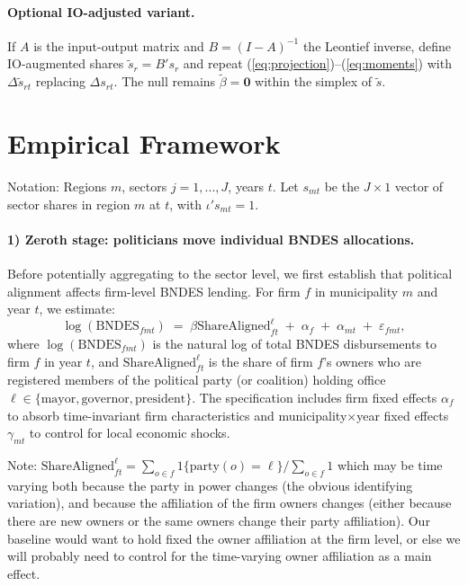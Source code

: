 \documentclass{article}
\begin{document}
\paragraph{Optional IO-adjusted variant.}
If $A$ is the input-output matrix and $B=(I-A)^{-1}$ the Leontief inverse, define IO-augmented shares $\tilde s_r = B' s_r$
and repeat (\ref{eq:projection})--(\ref{eq:moments}) with $\Delta \tilde s_{rt}$ replacing $\Delta s_{rt}$.
The null remains $\tilde\beta=\mathbf{0}$ within the simplex of $\tilde s$.

\section{Empirical Framework}

Notation:
Regions $m$, sectors $j=1,...,J$, years $t$. Let $s_{mt}$ be the $J\times 1$ vector of sector shares in region $m$ at $t$, with $\iota' s_{mt} = 1$.

\paragraph{1) Zeroth stage: politicians move individual BNDES allocations.}

Before potentially aggregating to the sector level, we first establish that political alignment affects firm-level BNDES lending. For firm $f$ in municipality $m$ and year $t$, we estimate:
\begin{equation}
    \label{eq:zerothstage_emp}
    \log(\text{BNDES}_{fmt}) \;=\; \beta  \text{ShareAligned}^{\ell}_{ft} \;+\; \alpha_f \;+\; \alpha_{mt} \;+\; \varepsilon_{fmt},
\end{equation}
where $\log(\text{BNDES}_{fmt})$ is the natural log of total BNDES disbursements to firm $f$ in year $t$, and $\text{ShareAligned}^{\ell}_{ft}$ is the share of firm $f$'s owners who are registered members of the political party (or coalition) holding office $\ell \in \{\text{mayor}, \text{governor}, \text{president}\}$. The specification includes firm fixed effects $\alpha_f$ to absorb time-invariant firm characteristics and municipality$\times$year fixed effects $\gamma_{mt}$ to control for local economic shocks.

Note: $\text{ShareAligned}^{\ell}_{ft}=\sum_{o\in f} 1\{\text{party}(o)=\ell\}/\sum_{o\in f} 1$ which may be time varying both because the party in power changes (the obvious identifying variation), and because the affiliation of the firm owners changes (either because there are new owners or the same owners change their party affiliation). Our baseline would want to hold fixed the owner affiliation at the firm level, or else we will probably need to control for the time-varying owner affiliation as a main effect.
\end{document}
